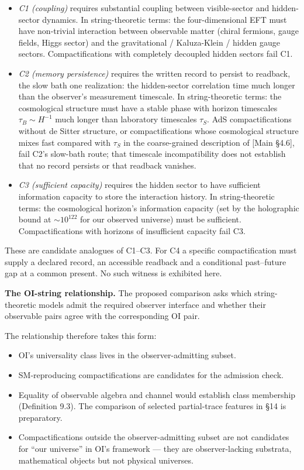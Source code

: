 \documentclass[
]{article}
\providecommand{\tightlist}{%
  \setlength{\itemsep}{0pt}\setlength{\parskip}{0pt}}
\begin{document}
\begin{itemize}
\item
  \emph{C1 (coupling)} requires substantial coupling between
  visible-sector and hidden-sector dynamics. In string-theoretic terms:
  the four-dimensional EFT must have non-trivial interaction between
  observable matter (chiral fermions, gauge fields, Higgs sector) and
  the gravitational / Kaluza-Klein / hidden gauge sectors.
  Compactifications with completely decoupled hidden sectors fail C1.
\item
  \emph{C2 (memory persistence)} requires the written record to persist
  to readback, the slow bath one realization: the hidden-sector
  correlation time much longer than the observer's measurement
  timescale. In string-theoretic terms: the cosmological structure must
  have a stable phase with horizon timescales \(\tau_B \sim H^{-1}\)
  much longer than laboratory timescales \(\tau_S\). AdS
  compactifications without de Sitter structure, or compactifications
  whose cosmological structure mixes fast compared with \(\tau_S\) in
  the coarse-grained description of {[}Main §4.6{]}, fail C2's slow-bath
  route; that timescale incompatibility does not establish that no
  record persists or that readback vanishes.
\item
  \emph{C3 (sufficient capacity)} requires the hidden sector to have
  sufficient information capacity to store the interaction history. In
  string-theoretic terms: the cosmological horizon's information
  capacity (set by the holographic bound at \(\sim 10^{122}\) for our
  observed universe) must be sufficient. Compactifications with horizons
  of insufficient capacity fail C3.
\end{itemize}

These are candidate analogues of C1--C3. For C4 a specific
compactification must supply a declared record, an accessible readback
and a conditional past--future gap at a common present. No such witness
is exhibited here.

\textbf{The OI-string relationship.} The proposed comparison asks which
string-theoretic models admit the required observer interface and
whether their observable pairs agree with the corresponding OI pair.

The relationship therefore takes this form:

\begin{itemize}
\tightlist
\item
  OI's universality class lives in the observer-admitting subset.
\item
  SM-reproducing compactifications are candidates for the admission
  check.
\item
  Equality of observable algebra and channel would establish class
  membership (Definition 9.3). The comparison of selected partial-trace
  features in §14 is preparatory.
\item
  Compactifications outside the observer-admitting subset are not
  candidates for ``our universe'' in OI's framework --- they are
  observer-lacking substrata, mathematical objects but not physical
  universes.
\end{itemize}
\end{document}
